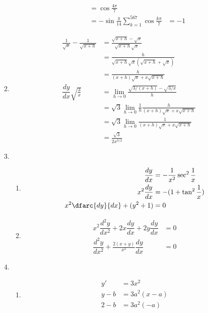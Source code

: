 \documentclass[12pt]{article}
\begin{document}
\begin{enumerate}
\begin{enumerate}
\begin{align*}
                &=\cos{\frac{4\pi}{7}}\\&=-\sin{\frac{\pi}{14}}
                \sum_{k=1}^{567}\cos{\frac{k\pi}{7}}&=-1
            \end{align*}
        \end{enumerate}
        \item \begin{align*}
            \frac{1}{\sqrt{x}}-\frac{1}{\sqrt{x+h}}&=\frac{\sqrt{x+h}-\sqrt{x}}{\sqrt{x+h}\sqrt{x}}\\
            &=\frac{h}{\sqrt{x+h}\sqrt{x}(\sqrt{x+h}+\sqrt{x})}\\
            &=\frac{h}{(x+h)\sqrt{x}+x\sqrt{x+h}}\\
            \dfrac{dy}{dx}\sqrt{\frac{3}{x}}&=\lim_{h\to 0}\frac{\sqrt{3/(x+h)}-\sqrt{3/x}}{h}\\
            &=\sqrt{3}\lim_{h\to 0}\frac{1}{h}\frac{h}{(x+h)\sqrt{x}+x\sqrt{x+h}}\\
            &=\sqrt{3}\lim_{h\to 0}\frac{1}{(x+h)\sqrt{x}+x\sqrt{x+h}}\\
            &=\frac{\sqrt{3}}{2x^{3/2}}
        \end{align*}
        \item \begin{enumerate}
            \item \begin{align*}
                \dfrac{dy}{dx}&=-\frac{1}{x^2}\sec^2{\frac{1}{x}}\\
                x^2\dfrac{dy}{dx}&=-(1+\tan^2{\frac{1}{x}})\\
                x^2\dfarc{dy}{dx}+(y^2+1)&=0
            \end{align*}
            \item \begin{align*}
                x^2\dfrac{d^2y}{dx^2}+2x\dfrac{dy}{dx}+2y\dfrac{dy}{dx}&=0\\
                \dfrac{d^2y}{dx^2}+\frac{2(x+y)}{x^2}\dfrac{dy}{dx}&=0
            \end{align*}
        \end{enumerate}
        \item \begin{enumerate}
            \item \begin{align*}
                y'&=3x^2\\
                y-b&=3a^2(x-a)\\
                2-b&=3a^2(-a)\\

\end{align*}
\end{enumerate}
\end{enumerate}
\end{document}
